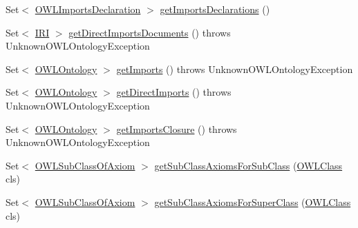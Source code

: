 \begin{DoxyCompactItemize}
\item 
Set$<$ \hyperlink{interfaceorg_1_1semanticweb_1_1owlapi_1_1model_1_1_o_w_l_imports_declaration}{O\-W\-L\-Imports\-Declaration} $>$ \hyperlink{classuk_1_1ac_1_1manchester_1_1cs_1_1owl_1_1owlapi_1_1_o_w_l_ontology_impl_afbfd2b7a17893f68058c9a31859a1d3f}{get\-Imports\-Declarations} ()
\item 
Set$<$ \hyperlink{classorg_1_1semanticweb_1_1owlapi_1_1model_1_1_i_r_i}{I\-R\-I} $>$ \hyperlink{classuk_1_1ac_1_1manchester_1_1cs_1_1owl_1_1owlapi_1_1_o_w_l_ontology_impl_a4f047c5e8d5b7fa3a18039c166b0106e}{get\-Direct\-Imports\-Documents} ()  throws Unknown\-O\-W\-L\-Ontology\-Exception 
\item 
Set$<$ \hyperlink{interfaceorg_1_1semanticweb_1_1owlapi_1_1model_1_1_o_w_l_ontology}{O\-W\-L\-Ontology} $>$ \hyperlink{classuk_1_1ac_1_1manchester_1_1cs_1_1owl_1_1owlapi_1_1_o_w_l_ontology_impl_a4e1e3fce87307560a544be82cf98ed86}{get\-Imports} ()  throws Unknown\-O\-W\-L\-Ontology\-Exception 
\item 
Set$<$ \hyperlink{interfaceorg_1_1semanticweb_1_1owlapi_1_1model_1_1_o_w_l_ontology}{O\-W\-L\-Ontology} $>$ \hyperlink{classuk_1_1ac_1_1manchester_1_1cs_1_1owl_1_1owlapi_1_1_o_w_l_ontology_impl_a44e8a0b124ee1eebaf2984d2b1b7a1b4}{get\-Direct\-Imports} ()  throws Unknown\-O\-W\-L\-Ontology\-Exception 
\item 
Set$<$ \hyperlink{interfaceorg_1_1semanticweb_1_1owlapi_1_1model_1_1_o_w_l_ontology}{O\-W\-L\-Ontology} $>$ \hyperlink{classuk_1_1ac_1_1manchester_1_1cs_1_1owl_1_1owlapi_1_1_o_w_l_ontology_impl_a0a431d2a07b584d9d868408ed5a4daf4}{get\-Imports\-Closure} ()  throws Unknown\-O\-W\-L\-Ontology\-Exception 
\item 
Set$<$ \hyperlink{interfaceorg_1_1semanticweb_1_1owlapi_1_1model_1_1_o_w_l_sub_class_of_axiom}{O\-W\-L\-Sub\-Class\-Of\-Axiom} $>$ \hyperlink{classuk_1_1ac_1_1manchester_1_1cs_1_1owl_1_1owlapi_1_1_o_w_l_ontology_impl_a1ed62c402321f9552003b422ac830073}{get\-Sub\-Class\-Axioms\-For\-Sub\-Class} (\hyperlink{interfaceorg_1_1semanticweb_1_1owlapi_1_1model_1_1_o_w_l_class}{O\-W\-L\-Class} cls)
\item 
Set$<$ \hyperlink{interfaceorg_1_1semanticweb_1_1owlapi_1_1model_1_1_o_w_l_sub_class_of_axiom}{O\-W\-L\-Sub\-Class\-Of\-Axiom} $>$ \hyperlink{classuk_1_1ac_1_1manchester_1_1cs_1_1owl_1_1owlapi_1_1_o_w_l_ontology_impl_a7ef02f0b977036162d447eb4623ac2ff}{get\-Sub\-Class\-Axioms\-For\-Super\-Class} (\hyperlink{interfaceorg_1_1semanticweb_1_1owlapi_1_1model_1_1_o_w_l_class}{O\-W\-L\-Class} cls)
\item 

\end{DoxyCompactItemize}
